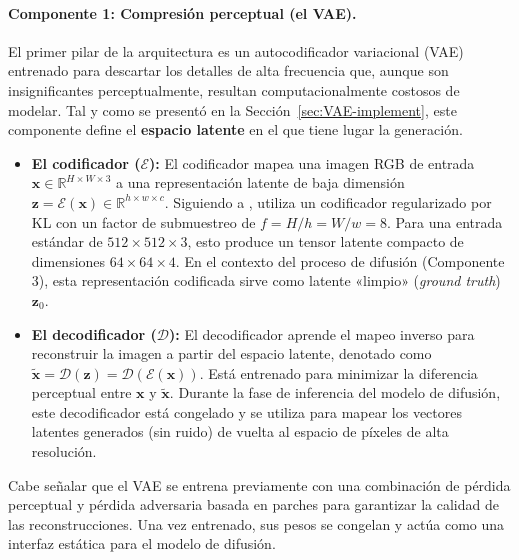 \documentclass[../../book-main_es.tex]{subfiles}
\begin{document}
\paragraph{Componente 1: Compresión perceptual (el VAE).}
El primer pilar de la arquitectura es un autocodificador variacional (VAE) entrenado para 
descartar los detalles de alta frecuencia que, aunque son insignificantes perceptualmente,
resultan computacionalmente costosos de modelar. Tal 
y como se presentó en la Sección~\ref{sec:VAE-implement}, este componente define el 
\textbf{espacio latente} en el que tiene lugar la generación.
\begin{itemize}
    \item \textbf{El codificador ($\mathcal{E}$):} El codificador mapea una imagen RGB de 
          entrada $\boldsymbol{x} \in \mathbb{R}^{H \times W \times 3}$ a una representación 
          latente de baja dimensión 
          $\boldsymbol{z} = \mathcal{E}(\boldsymbol{x}) \in \mathbb{R}^{h \times w \times c}$. 
          Siguiendo a \cite{rombach2022high}, utiliza un codificador regularizado por KL con un 
          factor de submuestreo de $f=H/h=W/w=8$. Para una entrada estándar de 
          $512 \times 512 \times 3$, esto produce un tensor latente compacto de dimensiones 
          $64 \times 64 \times 4$. En el contexto del proceso de difusión (Componente 3), esta 
          representación codificada sirve como latente «limpio» (\textit{ground truth}) $\boldsymbol{z}_0$.

    \item \textbf{El decodificador ($\mathcal{D}$):} El decodificador aprende el mapeo 
          inverso para reconstruir la imagen a partir del espacio latente, denotado como 
          $\tilde{\boldsymbol{x}} = \mathcal{D}(\boldsymbol{z}) = \mathcal{D}(\mathcal{E}(\boldsymbol{x}))$. 
          Está entrenado para minimizar la diferencia perceptual entre 
          $\boldsymbol{x}$ y $\tilde{\boldsymbol{x}}$. Durante la fase de inferencia del modelo de 
          difusión, este decodificador está congelado y se utiliza para mapear los vectores latentes 
          generados (sin ruido) de vuelta al espacio de píxeles de alta resolución.
\end{itemize}
Cabe señalar que el VAE se entrena previamente con una combinación de pérdida perceptual y pérdida 
adversaria basada en parches para garantizar la calidad de las reconstrucciones. Una vez entrenado, 
sus pesos se congelan y actúa como una interfaz estática para el modelo de difusión.
\end{document}
